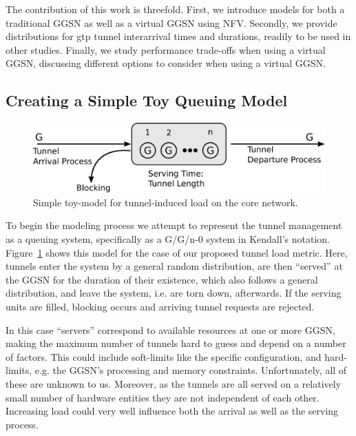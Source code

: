The contribution of this work is threefold. First, we introduce models for both a traditional \gls{GGSN} as well as a virtual \gls{GGSN} using \gls{NFV}. Secondly, we provide distributions for \gls{gtp} tunnel interarrival times and durations, readily to be used in other studies. Finally, we study performance trade-offs when using a virtual \gls{GGSN}, discussing different options to consider when using a virtual \gls{GGSN}.


\subsection{Creating a Simple Toy Queuing Model}

\begin{figure}[htb]
	\centering
	\includegraphics[width=\columnwidth]{images/GGn-model.pdf}
	\caption{Simple toy-model for tunnel-induced load on the core network.}
	\label{c4:fig:ggn-model}
\end{figure}

To begin the modeling process we attempt to represent the tunnel management as a queuing system, specifically as a G/G/n-0 system in Kendall's notation. Figure~\ref{c4:fig:ggn-model} shows this model for the case of our proposed tunnel load metric. Here, tunnels enter the system by a general random distribution, are then ``served'' at the \gls{GGSN} for the duration of their existence, which also follows a general distribution, and leave the system, i.e. are torn down, afterwards. If the serving units are filled, blocking occurs and arriving tunnel requests are rejected.

In this case ``servers'' correspond to available resources at one or more \gls{GGSN}, making the maximum number of tunnels hard to guess and depend on a number of factors. This could include soft-limits like the specific configuration, and hard-limits, e.g. the \gls{GGSN}'s processing and memory constraints. Unfortunately, all of these are unknown to us. Moreover, as the tunnels are all served on a relatively small number of hardware entities they are not independent of each other. Increasing load could very well influence both the arrival as well as the serving process.

